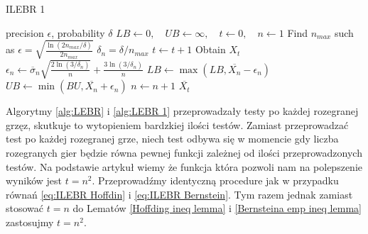\documentclass[inzynierska]{pwr_wmat_praca_dyplomowa}
\theoremstyle{plain}
\numberwithin{theorem}{chapter}
\theoremstyle{definition}
\numberwithin{theorem}{chapter}
\begin{document}
	\begin{algorithm}[H]
		\caption{ILEBR 1}\label{alg:LEBR 1}
		\begin{algorithmic}
			\Ensure precision $\epsilon$, probability $\delta$
			\State $LB \gets 0, \quad UB \gets \infty, \quad t \gets 0,\quad n \gets 1$
			\State Find $n_{max}$ such as $		\epsilon =  \sqrt{\frac{\ln(2n_{max}/\delta)}{2n_{max}}} $
			\Statex $\delta_n = \delta/n_{max}$
			\State $t \gets t + 1$
			\State Obtain $X_t$
			\State $\epsilon_n \gets \overline{\sigma}_n \sqrt{\frac{2\ln(3/\delta_n)}{n}} + \frac{3  \ln{(3 / \delta_n)}}{n}$ 
			\State $LB \gets \max(LB,  \overline{X_n} - \epsilon_n)$
			\State $UB \gets \min(BU,  \overline{X_n} + \epsilon_n)$
			\State $n \gets n + 1$
			\EndWhile
			\State \Return $ \overline{X_t}$		
		\end{algorithmic}
	\end{algorithm}
	Algorytmy \ref{alg:LEBR} i \ref{alg:LEBR 1} przeprowadzały testy po każdej rozegranej grzęz, skutkuje to wytopieniem bardzkiej ilości testów. Zamiast przeprowadzać test po każdej rozegranej grze, niech test odbywa się w momencie gdy liczba rozegranych gier będzie równa pewnej funkcji zależnej od ilości przeprowadzonych testów. Na podstawie artykuł \cite{heidrich2011non} wiemy że funkcja która pozwoli nam na polepszenie wyników jest $t = n^2$. Przeprowadźmy identyczną procedure jak w przypadku równań \ref{eq:ILEBR Hoffdin} i \ref{eq:ILEBR Bernstein}. Tym razem jednak zamiast stosować $t = n$ do Lematów \ref{Hoffding ineq lemma} i \ref{Bernsteina emp ineq lemma}  zastosujmy $t = n^2$.
	
\end{document}
